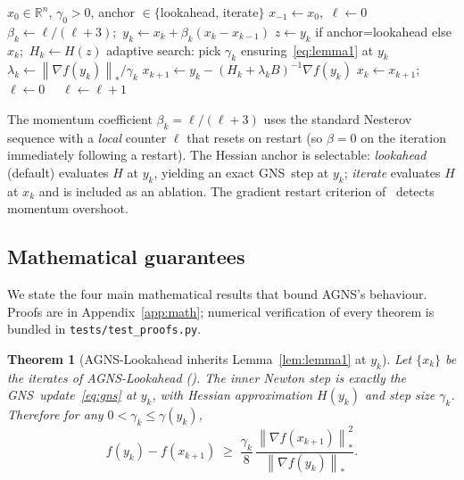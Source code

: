 \documentclass[conference]{IEEEtran}
\newtheorem{theorem}{Theorem}
\theoremstyle{remark}
\newcommand{\R}{\mathbb{R}}
\newcommand{\dnorm}[1]{\left\lVert#1\right\rVert_*}
\newcommand{\AGNS}{\textsc{AGNS}}
\newcommand{\GNS}{\textsc{GNS}}
\begin{document}
\begin{algorithm}[t]
\caption{\AGNS: Accelerated \GNS\ with gradient restart}
\label{alg:agns}
\footnotesize
\begin{algorithmic}[1]
  \Require $x_0 \in \R^n$, $\gamma_0 > 0$, anchor $\in\{$lookahead, iterate$\}$
  \State $x_{-1} \gets x_0$,\ $\ell \gets 0$
    \State $\beta_k \gets \ell/(\ell+3)$;\ $y_k \gets x_k + \beta_k(x_k - x_{k-1})$
    \State $z \gets y_k$ if anchor=lookahead else $x_k$;\ $H_k \gets H(z)$
    \State adaptive search: pick $\gamma_k$ ensuring~\eqref{eq:lemma1} at $y_k$
    \State $\lambda_k \gets \dnorm{\nabla f(y_k)}/\gamma_k$
    \State $x_{k+1} \gets y_k - (H_k + \lambda_k B)^{-1}\nabla f(y_k)$
      \State $x_k \gets x_{k+1}$;\ $\ell \gets 0$ 
    \Else \ \ $\ell \gets \ell+1$
    \EndIf
  \EndFor
\end{algorithmic}
\end{algorithm}

The momentum coefficient $\beta_k = \ell/(\ell+3)$ uses the standard
Nesterov sequence with a \emph{local} counter $\ell$ that resets on
restart (so $\beta = 0$ on the iteration immediately following a
restart). The Hessian anchor is selectable: \emph{lookahead}
(default) evaluates $H$ at $y_k$, yielding an exact \GNS\ step at
$y_k$; \emph{iterate} evaluates $H$ at $x_k$ and is included as an
ablation. The gradient restart criterion of~\cite{odonoghue2015restart}
detects momentum overshoot.

\subsection{Mathematical guarantees}
\label{sec:guarantees}

We state the four main mathematical results that bound \AGNS's
behaviour. Proofs are in Appendix~\ref{app:math}; numerical
verification of every theorem is bundled in
\texttt{tests/test\_proofs.py}.

\begin{theorem}[\AGNS-Lookahead inherits Lemma~\ref{lem:lemma1} at $y_k$]
\label{thm:lemma1-inheritance}
Let $\{x_k\}$ be the iterates of \AGNS-Lookahead ().
The inner Newton step is exactly the \GNS\ update~\eqref{eq:gns} at
$y_k$, with Hessian approximation $H(y_k)$ and step size $\gamma_k$.
Therefore for any $0 < \gamma_k \le \gamma(y_k)$,
\begin{equation}
\label{eq:lemma1-yk}
f(y_k) - f(x_{k+1}) \;\geq\; \frac{\gamma_k}{8}\,
  \frac{\dnorm{\nabla f(x_{k+1})}^2}{\dnorm{\nabla f(y_k)}}.
\end{equation}
\end{theorem}
\end{document}
